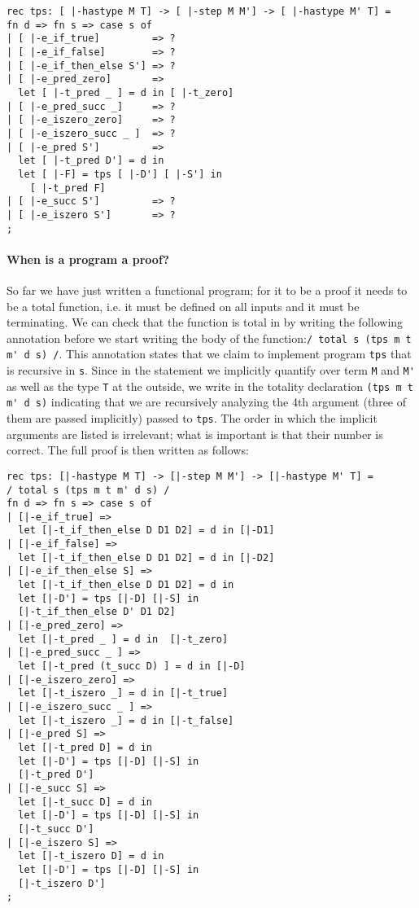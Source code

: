 \begin{lstlisting}
rec tps: [ |-hastype M T] -> [ |-step M M'] -> [ |-hastype M' T] =
fn d => fn s => case s of
| [ |-e_if_true]         => ?
| [ |-e_if_false]        => ?
| [ |-e_if_then_else S'] => ?
| [ |-e_pred_zero]       =>
  let [ |-t_pred _ ] = d in [ |-t_zero]
| [ |-e_pred_succ _]     => ?
| [ |-e_iszero_zero]     => ?
| [ |-e_iszero_succ _ ]  => ?
| [ |-e_pred S']         =>
  let [ |-t_pred D'] = d in
  let [ |-F] = tps [ |-D'] [ |-S'] in
    [ |-t_pred F]
| [ |-e_succ S']         => ?
| [ |-e_iszero S']       => ?
;
\end{lstlisting}


\paragraph{When is a program a proof?} So far we have just written a
functional program; for it to be a proof it needs to be a total
function, i.e. it must be defined on all inputs and it must be
terminating. We can check that the function is total in \beluga by
writing the following annotation before we start writing the body of
the function:\lstinline!/ total s (tps m t m' d s) /!. This
annotation states that we claim to implement program \lstinline!tps! that is
recursive in \lstinline!s!. Since in the statement we implicitly
quantify over term \lstinline!M! and \lstinline!M'! as well as the
type \lstinline!T! at the outside, we write in the totality 
declaration \lstinline!(tps m t m' d s)! indicating that we are
recursively analyzing the 4th argument (three of them are passed
implicitly) passed to \lstinline!tps!. The order in which the
implicit arguments are listed is irrelevant; what is important is
that their number is correct.
The full proof is then written as follows:


\begin{lstlisting}
rec tps: [|-hastype M T] -> [|-step M M'] -> [|-hastype M' T] =
/ total s (tps m t m' d s) /
fn d => fn s => case s of
| [|-e_if_true] =>
  let [|-t_if_then_else D D1 D2] = d in [|-D1]
| [|-e_if_false] =>
  let [|-t_if_then_else D D1 D2] = d in [|-D2]
| [|-e_if_then_else S] =>
  let [|-t_if_then_else D D1 D2] = d in
  let [|-D'] = tps [|-D] [|-S] in
  [|-t_if_then_else D' D1 D2]
| [|-e_pred_zero] =>
  let [|-t_pred _ ] = d in  [|-t_zero]
| [|-e_pred_succ _ ] =>
  let [|-t_pred (t_succ D) ] = d in [|-D]
| [|-e_iszero_zero] =>
  let [|-t_iszero _] = d in [|-t_true]
| [|-e_iszero_succ _ ] =>
  let [|-t_iszero _] = d in [|-t_false]
| [|-e_pred S] =>
  let [|-t_pred D] = d in
  let [|-D'] = tps [|-D] [|-S] in
  [|-t_pred D']
| [|-e_succ S] =>
  let [|-t_succ D] = d in
  let [|-D'] = tps [|-D] [|-S] in
  [|-t_succ D']
| [|-e_iszero S] =>
  let [|-t_iszero D] = d in
  let [|-D'] = tps [|-D] [|-S] in
  [|-t_iszero D']
;
\end{lstlisting}

